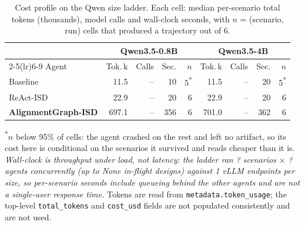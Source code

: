 
\begin{table}[t]
  \caption{Cost profile on the Qwen size ladder. Each cell: median per-scenario total tokens (thousands), model calls and wall-clock seconds, with $n$ = (scenario, run) cells that produced a trajectory out of 6.}
  \label{tab:cost}
  \footnotesize
  \setlength{\tabcolsep}{2pt}
  \begin{tabular}{@{}lr@{\hskip 3pt}r@{\hskip 3pt}r@{\hskip 3pt}rr@{\hskip 3pt}r@{\hskip 3pt}r@{\hskip 3pt}r@{}}
    \toprule
    & \multicolumn{4}{c}{Qwen3.5-0.8B} & \multicolumn{4}{c}{Qwen3.5-4B} \\
    \cmidrule(lr){2-5}\cmidrule(lr){6-9}
    Agent & Tok.\,k & Calls & Sec. & $n$ & Tok.\,k & Calls & Sec. & $n$ \\
    \midrule
    Baseline & 11.5 & -- & 10 & 5\textsuperscript{*} & 11.5 & -- & 20 & 5\textsuperscript{*} \\
    ReAct-ISD & 22.9 & -- & 20 & 6 & 22.9 & -- & 20 & 6 \\
    \textbf{AlignmentGraph-ISD} & 697.1 & -- & 356 & 6 & 701.0 & -- & 362 & 6 \\
    \bottomrule
  \end{tabular}
  \par\smallskip\footnotesize\textsuperscript{*}$n$ below 95\% of cells: the agent crashed on the rest and left no artifact, so its cost here is conditional on the scenarios it survived and reads cheaper than it is. \emph{Wall-clock is throughput under load, not latency: the ladder ran ? scenarios $\times$ ? agents concurrently (up to None in-flight designs) against 1 vLLM endpoints per size, so per-scenario seconds include queueing behind the other agents and are not a single-user response time.} Tokens are read from \texttt{metadata.token\_usage}; the top-level \texttt{total\_tokens} and \texttt{cost\_usd} fields are not populated consistently and are not used.
\end{table}
